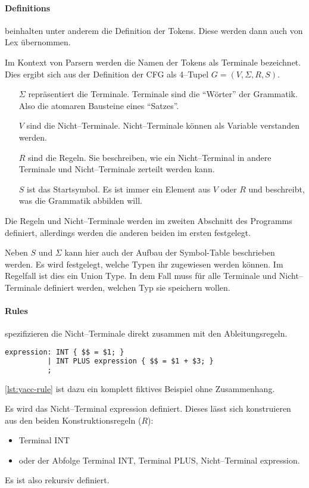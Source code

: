 \paragraph{Definitions} beinhalten unter anderem die Definition der Tokens.
Diese werden dann auch von Lex übernommen.

Im Kontext von Parsern werden die Namen der Tokens als Terminale bezeichnet.
Dies ergibt sich aus der Definition der \ac{CFG} als 4--Tupel $G=(V,\Sigma,R,S)$.~\autocite{sipser-1997}
\begin{itemize}
    \item[$\Sigma$] repräsentiert die Terminale.
    Terminale sind die \enquote{Wörter} der Grammatik.
    Also die atomaren Bausteine eines \enquote{Satzes}.
    \item[$V$] sind die Nicht--Terminale.
    Nicht--Terminale können als Variable verstanden werden.
    \item[$R$] sind die Regeln.
    Sie beschreiben, wie ein Nicht--Terminal in andere Terminale und Nicht--Terminale zerteilt werden kann.
    \item[$S$] ist das Startsymbol.
    Es ist immer ein Element aus $V$ oder $R$ und beschreibt, was die Grammatik abbilden will.
\end{itemize}
Die Regeln und Nicht--Terminale werden im zweiten Abschnitt des Programms definiert, allerdings werden die anderen beiden im ersten festgelegt.

Neben $S$ und $\Sigma$ kann hier auch der Aufbau der Symbol-Table beschrieben werden.
Es wird festgelegt, welche Typen ihr zugewiesen werden können.
Im Regelfall ist dies ein Union Type.
In dem Fall muss für alle Terminale und Nicht--Terminale definiert werden, welchen Typ sie speichern wollen.

\paragraph{Rules} spezifizieren die Nicht--Terminale direkt zusammen mit den Ableitungsregeln.
\begin{lstlisting}[label={lst:yacc-rule},caption={\acs{YACC} Regel},language=yacc]
expression: INT { $$ = $1; }
          | INT PLUS expression { $$ = $1 + $3; }
          ;
\end{lstlisting}
\autoref{lst:yacc-rule} ist dazu ein komplett fiktives Beispiel ohne Zusammenhang.

Es wird das Nicht--Terminal {\ttfamily expression} definiert.
Dieses lässt sich konstruieren aus den beiden Konstruktionsregeln ($R$):
\begin{itemize}
    \item Terminal {\ttfamily INT}
    \item oder der Abfolge Terminal {\ttfamily INT}, Terminal {\ttfamily PLUS}, Nicht--Terminal {\ttfamily expression}.
\end{itemize}
Es ist also rekursiv definiert.

